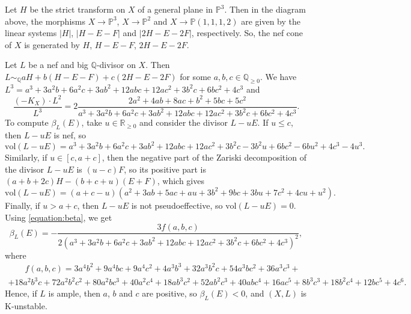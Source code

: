 \documentclass[12pt]{amsart}
\theoremstyle{definition}
\theoremstyle{remark}
\begin{document}
Let $H$ be the strict transform on $X$ of a general plane in $\mathbb{P}^3$. Then in the diagram above, the morphisms $X\to\mathbb{P}^3$, $X\to\mathbb{P}^2$ and $X\to\mathbb{P}(1,1,1,2)$ are given by the linear systems $|H|$, $|H-E-F|$ and $|2H-E-2F|$, respectively. So, the nef cone of $X$ is generated by  $H$, $H-E-F$, $2H-E-2F$.

Let $L$ be a nef and big $\mathbb{Q}$-divisor on $X$. Then $L\sim_{\mathbb{Q}} aH+b(H-E-F)+c(2H-E-2F)$ for some $a,b,c\in\mathbb{Q}_{\geqslant 0}$. We have
$L^3=a^3+3a^2b+6a^2c+3ab^2+12abc+12ac^2+3b^2c+6bc^2+4c^3$ and
$$
\frac{(-K_X)\cdot L^{2}}{L^3}=2\frac{2a^2+4ab+8ac+b^2+5bc+5c^2}{a^3+3a^2b+6a^2c+3ab^2+12abc+12ac^2+3b^2c+6bc^2+4c^3}.
$$
To compute $\beta_{L}(E)$, take $u\in\mathbb{R}_{\geqslant 0}$ and consider the divisor $L-uE$. If $u\leqslant c$, then $L-uE$ is nef, so
$$
\mathrm{vol}(L-uE)=a^3+3a^2b+6a^2c+3ab^2+12abc+12ac^2+3b^2c-3b^2u+6bc^2-6bu^2+4c^3-4u^3.
$$
Similarly, if $u\in[c,a+c]$, then the negative part of the Zariski decomposition of the divisor $L-uE$ is $(u-c)F$, so its positive part is $(a+b+2c)H-(b+c+u)(E+F)$, which gives
$$
\mathrm{vol}(L-uE)=(a+c-u)(a^2+3ab+5ac+au+3b^2+9bc+3bu+7c^2+4cu+u^2).
$$
Finally, if $u>a+c$, then $L-uE$ is not pseudoeffective, so $\mathrm{vol}(L-uE)=0$. Using \eqref{equation:beta}, we get
$$
\beta_{L}(E)=-\frac{3f(a,b,c)}{2(a^3+3a^2b+6a^2c+3ab^2+12abc+12ac^2+3b^2c+6bc^2+4c^3)^2},
$$
where
\begin{multline*}
\quad \quad f(a,b,c)=3a^4b^2+9a^4bc+9a^4c^2+4a^3b^3+32a^3b^2c+54a^3bc^2+36a^3c^3+\\
+18a^2b^3c+72a^2b^2c^2+80a^2bc^3+40a^2c^4+18ab^3c^2+52ab^2c^3+
40abc^4+16ac^5+ 8b^3c^3+18b^2c^4+12bc^5+4c^6.
\end{multline*}
Hence, if $L$ is ample, then $a$, $b$ and $c$ are positive, so $\beta_L(E)<0$, and $(X,L)$ is K-unstable.
\end{document}
